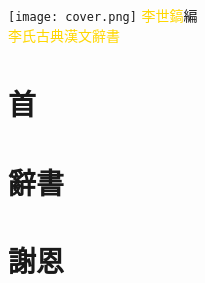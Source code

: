 \documentclass[a5paper,11pt]{report}
\begin{document}
\begin{titlepage}
\doublespacing
\hfill
\vfill
\hspace{-40mm}
\texttt{[image: cover.png]}
\vfill
{\textcolor{gold}{李世鎬}\hspace{14pt}編}\\
{\huge\textcolor{gold}{李氏古典漢文辭書}}
\vfill
\end{titlepage}
\newpage
\chapter*{首}
\doublespacing


\chapter*{辭書}
\begin{multicols}{2}
\begin{flushleft}
\onehalfspacing

\end{flushleft}
\end{multicols}

\chapter*{謝恩}
\doublespacing

\end{document}
